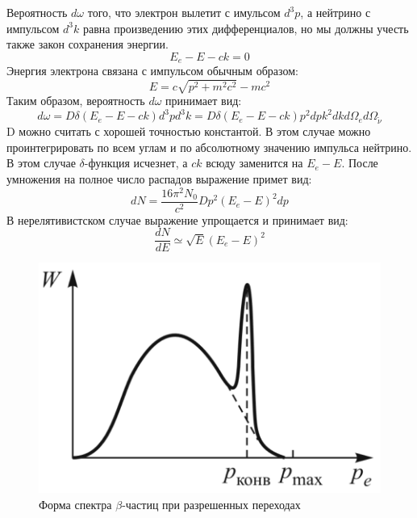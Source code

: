 \documentclass[a4paper, 12pt]{article}
\begin{document}
		Вероятность $d\omega$ того, что электрон вылетит с имульсом $d^3p$, а нейтрино с импульсом $d^3k$ равна произведению этих дифференциалов, но мы должны учесть также закон сохранения энергии.
		\begin{equation}
		    E_e - E - ck = 0
		\end{equation}
		Энергия электрона связана с импульсом обычным образом:
		\begin{equation}
		    E = c\sqrt{p^2 + m^2c^2} -mc^2
		\end{equation}
		Таким образом, вероятность $d\omega$ принимает вид:
		\begin{equation}
		    d\omega = D\delta(E_e-E-ck)d^3pd^3k = D\delta(E_e-E-ck)p^2d pk^2d kd\Omega_ed\Omega_{\widetilde{\nu}}
		\end{equation}
		D можно считать с хорошей точностью константой. В этом случае можно проинтегрировать по всем углам и по абсолютному значению импульса нейтрино. В этом случае $\delta$-функция исчезнет, а $ck$ всюду заменится на $E_e-E$. После умножения на полное число распадов выражение примет вид:
		\begin{equation}
		    d N = \frac{16\pi^2N_0}{c^2} D p^2\left(E_e-E\right)^2d p
		\end{equation}
		В нерелятивистском случае выражение упрощается и принимает вид:
		\begin{equation}
			\frac{d N}{d E} \simeq \sqrt{E}(E_e - E)^2
		\end{equation} 
		\begin{figure}[h!]
			\centering
			\includegraphics[width=0.6\linewidth]{pic1}
			\caption{Форма спектра $\beta$-частиц при разрешенных переходах}
		\end{figure}
\end{document}
